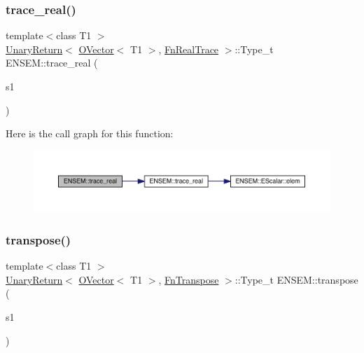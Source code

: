 \subsubsection{\texorpdfstring{trace\_real()}{trace\_real()}}
{\footnotesize\ttfamily template$<$class T1 $>$ \\
\mbox{\hyperlink{structENSEM_1_1UnaryReturn}{Unary\+Return}}$<$ \mbox{\hyperlink{classENSEM_1_1OVector}{O\+Vector}}$<$ T1 $>$, \mbox{\hyperlink{structENSEM_1_1FnRealTrace}{Fn\+Real\+Trace}} $>$\+::Type\+\_\+t E\+N\+S\+E\+M\+::trace\+\_\+real (\begin{DoxyParamCaption}\item[{const \mbox{\hyperlink{classENSEM_1_1OVector}{O\+Vector}}$<$ T1 $>$ \&}]{s1 }\end{DoxyParamCaption})\hspace{0.3cm}{\ttfamily [inline]}}

Here is the call graph for this function\+:\nopagebreak
\begin{figure}[H]
\begin{center}
\leavevmode
\includegraphics[width=350pt]{da/d59/group__obsvector_ga89062217a6c2e9173699e36b88ed9b05_cgraph}
\end{center}
\end{figure}
\mbox{\label{group__obsvector_ga9c3c97af68e1cfa2eb913c66fa87188b}} 
\subsubsection{\texorpdfstring{transpose()}{transpose()}}
{\footnotesize\ttfamily template$<$class T1 $>$ \\
\mbox{\hyperlink{structENSEM_1_1UnaryReturn}{Unary\+Return}}$<$ \mbox{\hyperlink{classENSEM_1_1OVector}{O\+Vector}}$<$ T1 $>$, \mbox{\hyperlink{structENSEM_1_1FnTranspose}{Fn\+Transpose}} $>$\+::Type\+\_\+t E\+N\+S\+E\+M\+::transpose (\begin{DoxyParamCaption}\item[{const \mbox{\hyperlink{classENSEM_1_1OVector}{O\+Vector}}$<$ T1 $>$ \&}]{s1 }\end{DoxyParamCaption})\hspace{0.3cm}{\ttfamily [inline]}}

